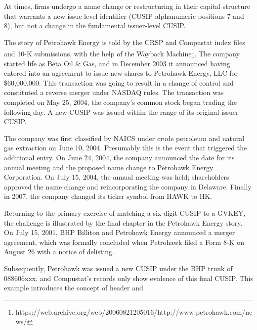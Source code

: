 \documentclass[12pt]{article}
\begin{document}
\begin{center}

\end{center}

At times, firms undergo a name change or restructuring in their capital structure that warrants a new issue level identifier (CUSIP alphanumeric positions 7 and 8), but not a change in the fundamental issuer-level CUSIP.

The story of Petrohawk Energy is told by the CRSP and Compustat index files and 10-K submissions, with the help of the Wayback Machine\footnote{https://web.archive.org/web/20060821205016/http://www.petrohawk.com/news/}.
The company started life as Beta Oil \& Gas, and in December 2003 it announced having entered into an agreement to issue new shares to Petrohawk Energy, LLC for \$60,000,000.
This transaction was going to result in a change of control and constituted a reverse merger under NASDAQ rules.
The transaction was completed on May 25, 2004, the company's common stock began trading the following day.
A new CUSIP was issued within the range of its original issuer CUSIP.

The company was first classified by NAICS under crude petroleum and natural gas extraction on June 10, 2004.
Presumably this is the event that triggered the additional entry. 
On June 24, 2004, the company announced the date for its annual meeting and the proposed name change to Petrohawk Energy Corporation.
On July 15, 2004, the annual meeting was held; shareholders approved the name change and reincorporating the company in Delaware.
Finally in 2007, the company changed its ticker symbol from HAWK to HK.

\begin{center}

\end{center}

Returning to the primary exercise of matching a six-digit CUSIP to a GVKEY, the challenge is illustrated by the final chapter in the Petrohawk Energy story.
On July 15, 2001, BHP Billiton and Petrohawk Energy announced a merger agreement, which was formally concluded when Petrohawk filed a Form 8-K on August 26 with a notice of delisting.

Subsequently, Petrohawk was issued a new CUSIP under the BHP trunk of 088606xxx, and Compustat's records only show evidence of this final CUSIP.
This example introduces the concept of header and 

\begin{center}

\end{center}
\end{document}

